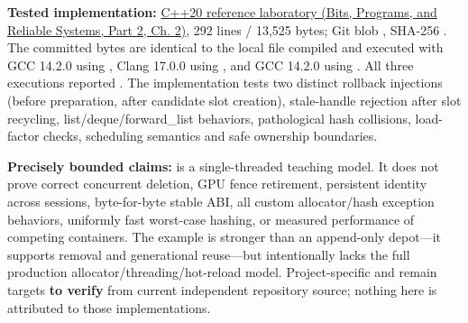 \textbf{Tested implementation:} \href{../01-Bits-Programs-and-Reliable-Systems-P02/main.pdf\#source-file-e829cf731b17419e282775cf}{C++20 reference laboratory (Bits, Programs, and Reliable Systems, Part 2, Ch. 2)}, 292 lines / 13,525 bytes; Git blob , SHA-256 . The committed bytes are identical to the local file compiled and executed with GCC 14.2.0 using , Clang 17.0.0 using , and GCC 14.2.0 using . All three executions reported . The implementation tests two distinct rollback injections (before preparation, after candidate slot creation), stale-handle rejection after slot recycling, list/deque/forward\_list behaviors, pathological hash collisions, load-factor checks, scheduling semantics and safe ownership boundaries.

\textbf{Precisely bounded claims:}  is a single-threaded teaching model. It does not prove correct concurrent deletion, GPU fence retirement, persistent identity across sessions, byte-for-byte stable ABI, all custom allocator/hash exception behaviors, uniformly fast worst-case hashing, or measured performance of competing containers. The example is stronger than an append-only depot---it supports removal and generational reuse---but intentionally lacks the full production allocator/threading/hot-reload model. Project-specific  and  remain targets \textbf{to verify} from current independent repository source; nothing here is attributed to those implementations.

